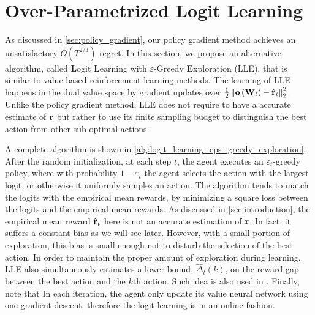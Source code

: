 \section{Over-Parametrized Logit Learning}
\label{sec:logit_learning}

As discussed in \cref{sec:policy_gradient}, our policy gradient method achieves an unsatisfactory $\tilde{O}(T^{2/3})$ regret.
In this section, we propose an alternative algorithm, called {\bf L}ogit {\bf L}earning with $\varepsilon$-Greedy {\bf E}xploration (LLE), that is similar to value based reinforcement learning methods.
The learning of LLE happens in the dual value space by gradient updates over $\frac{1}{2} \left\| {\mathbf{o}}\left( {\mathbf{W}}_t\right) - \hat{{\mathbf{r}}}_t \right\|_2^2$.
Unlike the policy gradient method, LLE does not require to have a accurate estimate of ${\mathbf{r}}$ but rather to use its finite sampling budget to distinguish the best action from other sub-optimal actions.

A complete algorithm is shown in \cref{alg:logit_learning_eps_greedy_exploration}. 
After the random initialization, at each step $t$, the agent executes an $\varepsilon_t$-greedy policy, where with probability $1 - \varepsilon_t$ the agent selects the action with the largest logit, or otherwise it uniformly samples an action.
The algorithm tends to match the logits with the empirical mean rewards, by minimizing a square loss between the logits and the empirical mean rewards.
As discussed in \cref{sec:introduction}, the empirical mean reward $\hat{{\mathbf{r}}}_t$ here is not an accurate estimation of ${\mathbf{r}}$. In fact, it suffers a constant bias as we will see later.
However, with a small portion of exploration, this bias is small enough not to disturb the selection of the best action.
In order to maintain the proper amount of exploration during learning, 
LLE also simultaneously estimates a lower bound, $\hat{\Delta}_t(k)$, on the reward gap between the best action and the $k$th action. 
Such idea is also used in  \cite{seldin2017improved}.
Finally, note that In each iteration, the agent only update its value neural network using one gradient descent, therefore the logit learning is in an online fashion.


